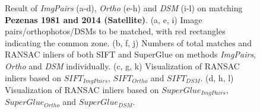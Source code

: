 \begin{figure}[htbp]
\begin{center}
{\begin{minipage}[t]{0.48\linewidth}
			\end{minipage}%
		}
		\caption{{\scriptsize Result of \textit{ImgPairs} (a-d), \textit{Ortho} (e-h) and \textit{DSM} (i-l) on matching \textbf{Pezenas 1981 and 2014 (Satellite)}. (a, e, i) Image pairs/orthophotos/DSMs to be matched, with red rectangles indicating the common zone. (b, f, j) Numbers of total matches and RANSAC inliers of both SIFT and SuperGlue on methods \textit{ImgPairs}, \textit{Ortho} and \textit{DSM} individually. (c, g, k) Visualization of RANSAC inliers based on $SIFT_{ImgPairs}$, $SIFT_{Ortho}$ and $SIFT_{DSM}$. (d, h, l) Visualization of RANSAC inliers based on $SuperGlue_{ImgPairs}$, $SuperGlue_{Ortho}$ and $SuperGlue_{DSM}$.}}        
		\label{MatchVizPezenas-Satellite1981DSM}
	\end{center}
\end{figure} 



